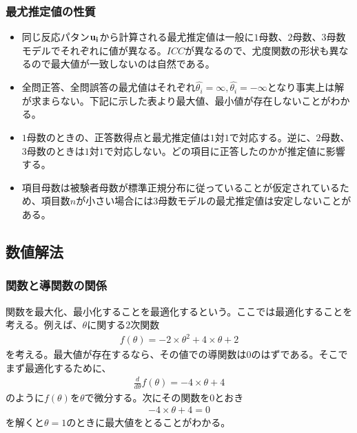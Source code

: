 \documentclass[12pt]{jarticle}
\begin{document}
\subsubsection{最尤推定値の性質}
\begin{itemize}
  \item 同じ反応パタン$\displaystyle \bf u_i$から計算される最尤推定値は一般に$1$母数、$2$母数、$3$母数モデルでそれぞれに値が異なる。$ICC$が異なるので、尤度関数の形状も異なるので最大値が一致しないのは自然である。
  \item 全問正答、全問誤答の最尤値はそれぞれ$\hat{\theta_i} = \infty,\hat{\theta_i} = -\infty$となり事実上は解が求まらない。下記に示した表より最大値、最小値が存在しないことがわかる。
  \item $1$母数のときの、正答数得点と最尤推定値は$1$対$1$で対応する。逆に、$2$母数、$3$母数のときは$1$対$1$で対応しない。どの項目に正答したのかが推定値に影響する。
  \item 項目母数は被験者母数が標準正規分布に従っていることが仮定されているため、項目数$n$が小さい場合には$3$母数モデルの最尤推定値は安定しないことがある。
\end{itemize}
\subsection{数値解法}
\subsubsection{関数と導関数の関係}
関数を最大化、最小化することを最適化するという。ここでは最適化することを考える。例えば、$\theta$に関する$2$次関数
\begin{eqnarray}
  \label{03}
  \displaystyle f(\theta) = -2 \times \theta^2 +4 \times \theta + 2
\end{eqnarray}
を考える。最大値が存在するなら、その値での導関数は$0$のはずである。そこでまず最適化するために、
\begin{eqnarray}
  \label{04}
  \displaystyle \frac{d}{d\theta}f(\theta) = -4 \times \theta +4
\end{eqnarray}
のように$f(\theta)$を$\theta$で微分する。次にその関数を$0$とおき
\begin{eqnarray}
  \label{04}
  \displaystyle  -4 \times \theta +4 = 0
\end{eqnarray}
を解くと$\theta = 1$のときに最大値をとることがわかる。
\end{document}
